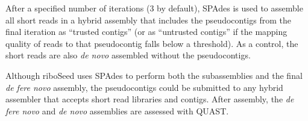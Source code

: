 \documentclass[10pt]{article}
\begin{document}
\begin{linenumbers}
After a specified number of iterations (3 by default), SPAdes is used to assemble all short reads in a hybrid assembly that includes the pseudocontigs from the final iteration as ``trusted contigs'' (or as ``untrusted contigs'' if the mapping quality of reads to that pseudocontig falls below a threshold). As a control, the short reads are also \textit{de novo} assembled without the pseudocontigs.


Although riboSeed uses SPAdes to perform both the subassemblies and the final \textit{de fere novo} assembly, the pseudocontigs could be submitted to any hybrid assembler that accepts short read libraries and contigs. After assembly, the \textit{de fere novo} and \textit{de novo} assemblies are assessed with QUAST\cite{Gurevich2013}.

\begin{figure}[h]
  \centering
  \begin{minipage}{.6\linewidth}
    \begin{algorithm}[H]

\end{algorithm}
\end{minipage}
\end{figure}
\end{linenumbers}
\end{document}
